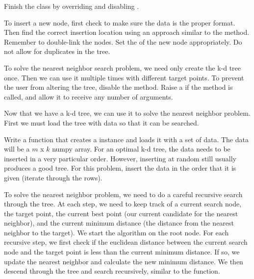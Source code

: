 \begin{problem}
Finish the  class by overriding  and disabling .

To insert a new node, first check to make sure the data is the proper format. Then find the correct insertion location using an approach similar to the  method. Remember to double-link the nodes. Set the  of the new node appropriately. Do not allow for duplicates in the tree.

To solve the nearest neighbor search problem, we need only create the k-d tree once. Then we can use it multiple times with different target points. To prevent the user from altering the tree, disable the  method. Raise a  if the method is called, and allow it to receive any number of arguments.

\end{problem}


Now that we have a k-d tree, we can use it to solve the nearest neighbor problem.
First we must load the tree with data so that it can be searched.

\begin{problem}
Write a function that creates a  instance and loads it with a set of data.
The data will be a $m$ x $k$ numpy array.
For an optimal k-d tree, the data needs to be inserted in a very particular order.
However, inserting at random still usually produces a good tree.
For this problem, insert the data in the order that it is given (iterate through the rows).
\end{problem}

To solve the nearest neighbor problem, we need to do a careful recursive search through the tree.
At each step, we need to keep track of a current search node, the target point, the current best point (our current candidate for the nearest neighbor), and the current minimum distance (the distance from the nearest neighbor to the target).
We start the algorithm on the root node.
For each recursive step, we first check if the euclidean distance between the current search node and the target point is less than the current minimum distance.
If so, we update the nearest neighbor and calculate the new minimum distance.
We then descend through the tree and search recursively, similar to the  function.

